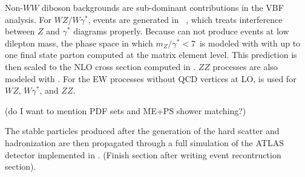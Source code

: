 Non-$WW$ diboson backgrounds are sub-dominant contributions in the VBF
analysis. For $WZ/W\gamma^{\ast}$, events are generated in \POWHEG~\cite{bib:Melia:2011tj},
which treats interference between $Z$ and $\gamma^{\ast}$ diagrams
properly. Because \POWHEG can not produce events at low dilepton mass,
the phase space in which $m_Z/\gamma^{\ast} < 7$~\gev is
modeled with \SHERPA with up to one final state parton computed at the
matrix element level. This prediction is then scaled to the NLO cross
section computed in \MCFM. $ZZ$ processes are also modeled with
\POWHEG. For the EW processes without QCD vertices at LO, \SHERPA is
used for $WZ$, $W\gamma^{\ast}$, and $ZZ$. 

(do I want to mention PDF sets and ME+PS shower matching?)

The stable particles produced after the generation of the hard scatter
and hadronization are then propagated through a full simulation of the
ATLAS detector implemented in \GEANT. (Finish section after writing
event recontruction section). 





